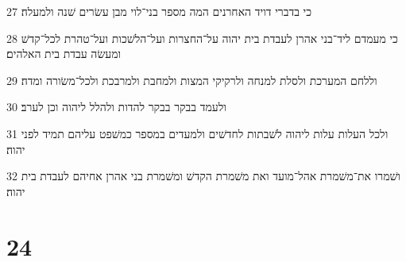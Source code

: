 \par 27 כי בדברי דויד האחרנים המה מספר בני־לוי מבן עשׂרים שׁנה ולמעלה׃
\par 28 כי מעמדם ליד־בני אהרן לעבדת בית יהוה על־החצרות ועל־הלשׁכות ועל־טהרת לכל־קדשׁ ומעשׂה עבדת בית האלהים׃
\par 29 וללחם המערכת ולסלת למנחה ולרקיקי המצות ולמחבת ולמרבכת ולכל־משׂורה ומדה׃
\par 30 ולעמד בבקר בבקר להדות ולהלל ליהוה וכן לערב׃
\par 31 ולכל העלות עלות ליהוה לשׁבתות לחדשׁים ולמעדים במספר כמשׁפט עליהם תמיד לפני יהוה׃
\par 32 ושׁמרו את־משׁמרת אהל־מועד ואת משׁמרת הקדשׁ ומשׁמרת בני אהרן אחיהם לעבדת בית יהוה׃

\chapter{24}

